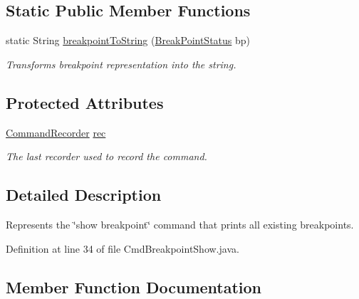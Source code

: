 \subsection*{Static Public Member Functions}
\begin{DoxyCompactItemize}
\item 
static String \hyperlink{classgov_1_1nasa_1_1jpf_1_1inspector_1_1client_1_1commands_1_1_cmd_breakpoint_show_ab3031b96714a7d518b98ecbb035490bf}{breakpoint\+To\+String} (\hyperlink{interfacegov_1_1nasa_1_1jpf_1_1inspector_1_1interfaces_1_1_break_point_status}{Break\+Point\+Status} bp)
\begin{DoxyCompactList}\small\item\em Transforms breakpoint representation into the string. \end{DoxyCompactList}\end{DoxyCompactItemize}
\subsection*{Protected Attributes}
\begin{DoxyCompactItemize}
\item 
\hyperlink{classgov_1_1nasa_1_1jpf_1_1inspector_1_1client_1_1_command_recorder}{Command\+Recorder} \hyperlink{classgov_1_1nasa_1_1jpf_1_1inspector_1_1client_1_1_client_command_af4246f2427035c72a6af45a2c61361f7}{rec}
\begin{DoxyCompactList}\small\item\em The last recorder used to record the command. \end{DoxyCompactList}\end{DoxyCompactItemize}


\subsection{Detailed Description}
Represents the \char`\"{}show breakpoint\char`\"{} command that prints all existing breakpoints. 

Definition at line 34 of file Cmd\+Breakpoint\+Show.\+java.



\subsection{Member Function Documentation}
